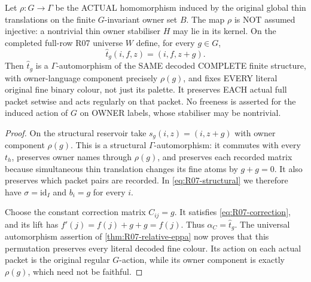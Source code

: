 \begin{lemma}
\label{lem:R07-global-diagonal-thin}
Let $\rho:G\to\Gamma$
be the ACTUAL homomorphism
induced by the original global
thin translations on the
finite $G$-invariant owner
set $B$. The map $\rho$
is NOT assumed injective:
a nontrivial thin owner
stabiliser $H$ may lie
in its kernel.
On the completed full-row
R07 universe $W$ define,
for every $g\in G$,
\[
          \widehat t_g(i,f,z)=(i,f,z+g).
\tag{RDT}\label{eq:R07-global-diagonal-thin}
\]
Then $\widehat t_g$ is a
$\Gamma$-automorphism of the
SAME decoded COMPLETE finite
structure, with owner-language
component precisely $\rho(g)$,
and fixes EVERY literal
original fine binary
colour, not just its palette.
It preserves EACH actual
full packet setwise and acts
regularly on that packet.
No freeness is asserted for
the induced action of $G$
on OWNER labels, whose
stabiliser may be nontrivial.
\end{lemma}
\begin{proof}
On the structural reservoir take $s_g(i,z)=(i,z+g)$ with
owner component $\rho(g)$. This is a structural
$\Gamma$-automorphism: it commutes with every $t_h$, preserves
owner names through $\rho(g)$, and preserves each recorded matrix
because simultaneous thin translation changes its fine atoms by
$g+g=0$. It also preserves which packet pairs are recorded.
In \eqref{eq:R07-structural} we therefore have
$\sigma=\mathrm{id}_I$ and $b_i=g$ for every $i$.

Choose the constant correction matrix $C_{ij}=g$. It satisfies
\eqref{eq:R07-correction}, and its lift has
$f'(j)=f(j)+g+g=f(j)$. Thus $\alpha_C=\widehat t_g$.
The universal automorphism assertion of
\cref{thm:R07-relative-eppa} now proves that this permutation
preserves every literal decoded fine colour. Its action on each
actual packet is the original regular $G$-action, while its owner
component is exactly $\rho(g)$, which need not be faithful.
\end{proof}
